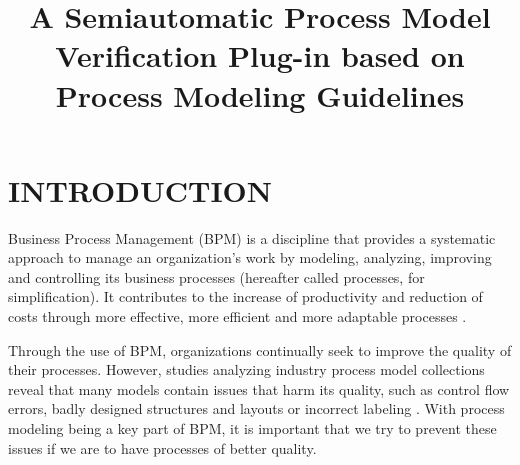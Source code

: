 \documentclass[a4paper,twoside]{article}
\begin{document}
\title{A Semiautomatic Process Model Verification Plug-in based on Process Modeling Guidelines}
\author{
}



\onecolumn \maketitle \normalsize \vfill

\section{INTRODUCTION} \label{Introduction}

\noindent Business Process Management (BPM) is a discipline that provides a systematic approach to manage an organization's work by modeling, analyzing, improving and controlling its business processes (hereafter called processes, for simplification). It contributes to the increase of productivity and reduction of costs through more effective, more efficient and more adaptable processes \cite{aalst:2013}. %

Through the use of BPM, organizations continually seek to improve the quality of their processes. However, studies analyzing industry process model collections reveal that many models contain issues that harm its quality, such as control flow errors, badly designed structures and layouts or incorrect labeling \cite{Detection and Prediction of Errors in EPCs of the SAP Reference Model.} \cite{What we can learn from Quality Issues of BPMN Models from Industry}. With process modeling being a key part of BPM, it is important that we try to prevent these issues if we are to have processes of better quality.
\end{document}
